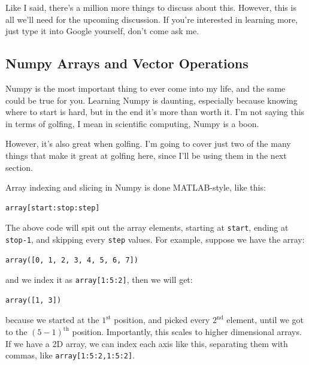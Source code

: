 \documentclass[12pt,twocolumn]{article}
\begin{document}
Like I said, there's a million more things to discuss about this. However, this is all we'll need for the upcoming discussion. If you're interested in learning more, just type it into Google yourself, don't come ask me.

\subsection{Numpy Arrays and Vector Operations}
Numpy is the most important thing to ever come into my life, and the same could be true for you. Learning Numpy is daunting, especially because knowing where to start is hard, but in the end it's more than worth it. I'm not saying this in terms of golfing, I mean in scientific computing, Numpy is a boon.

However, it's also great when golfing. I'm going to cover just two of the many things that make it great at golfing here, since I'll be using them in the next section.

Array indexing and slicing in Numpy is done MATLAB-style, like this:
\begin{verbatim}
array[start:stop:step]
\end{verbatim}
The above code will spit out the array elements, starting at \texttt{start}, ending at \texttt{stop-1}, and skipping every \texttt{step} values. For example, suppose we have the array:
\begin{verbatim}
array([0, 1, 2, 3, 4, 5, 6, 7])
\end{verbatim}
and we index it as \texttt{array[1:5:2]}, then we will get:
\begin{verbatim}
array([1, 3])
\end{verbatim}
because we started at the $1^\mathrm{st}$ position, and picked every $2^\mathrm{nd}$ element, until we got to the $(5-1)^{\mathrm{th}}$ position. Importantly, this scales to higher dimensional arrays. If we have a 2D array, we can index each axis like this, separating them with commas, like \texttt{array[1:5:2,1:5:2]}.
\end{document}
